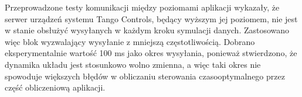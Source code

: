 Przeprowadzone testy komunikacji między poziomami aplikacji wykazały, że serwer urządzeń systemu Tango Controls, będący wyższym jej poziomem, nie jest w stanie obsłużyć wysyłanych w każdym kroku symulacji danych. Zastosowano więc blok wyzwalający wysyłanie z mniejszą częstotliwością. Dobrano eksperymentalnie wartość 100 ms jako okres wysyłania, ponieważ stwierdzono, że dynamika układu jest stosunkowo wolno zmienna, a więc taki okres nie spowoduje większych błędów w obliczaniu sterowania czasooptymalnego przez część obliczeniową aplikacji.